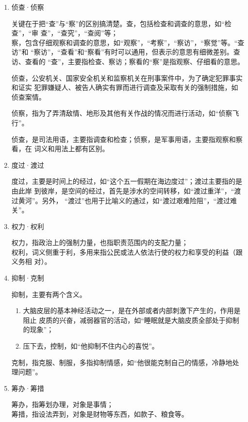 \documentclass[final,oneside]{ctexbook}
\begin{document}
\begin{enumerate}
  \item 侦查·侦察

    关键在于把“查”与“察”的区别搞清楚。查，包括检查和调查的意思，如“检查”，“审
    查”，“查究”，“查阅”等；\\
    察，包含仔细观察和调查的意思，如“观察”，“考察”，“察访”，“察觉”等。“查访”和
    “察访”，“查看”和“察看”有时可以通用，但表示的意思有细微差别。查访、查看的
    “查”，主要指检查、察访；察看的“察”是指观察、仔细看的意思。

    侦查，公安机关、国家安全机关和监察机关在刑事案件中，为了确定犯罪事实和证实
    犯罪嫌疑人、被告人确实有罪而进行调查及采取有关的强制措施，如侦查案情。

    侦察，指为了弄清敌情、地形及其他有关作战的情况而进行活动，如“侦察飞行”。

    侦查，是司法用语，主要指调查和检查；侦察，是军事用语，主要指观察和察看，在
    词义和用法上都有区别。

  \item 度过·渡过

    度过，主要是时间上的经过，如“这个五一假期在海边度过”；渡过主要指的是由此岸
    到彼岸，是空间的经过，首先是涉水的空间转移，如“渡过重洋”，“渡过黄河”。另外，
    “渡过”也用于比喻义的通过，如“渡过艰难险阻”，“渡过难关”。

  \item 权力·权利

    权力，指政治上的强制力量，也指职责范围内的支配力量；\\
    权利，词义侧重于利，多用来指公民或法人依法行使的权力和享受的利益（跟义务相
    对）。

  \item 抑制·克制

    抑制，主要有两个含义。

    \begin{enumerate}
      \item 大脑皮层的基本神经活动之一，是在外部或者内部刺激下产生的，作用是阻止
        皮质的兴奋，减弱器官的活动，如“睡眠就是大脑皮质全部处于抑制的现象”；
      \item 压下去，控制，如“他抑制不住内心的喜悦”。
    \end{enumerate}

    克制，指克服、制服，多指抑制情感，如“他很能克制自己的情感，冷静地处理问题”。

  \item 筹办·筹措

    筹办，指筹划办理，对象是事情；\\
    筹措，指设法弄到，对象是财物等东西，如款子、粮食等。


\end{enumerate}
\end{document}
